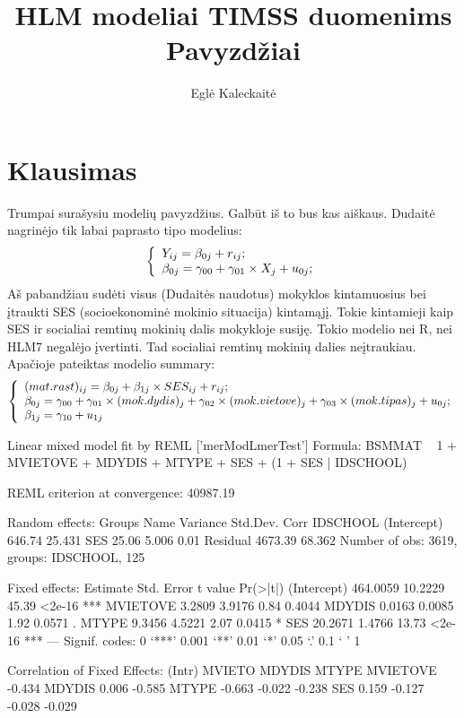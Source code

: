 \documentclass[a4paper]{article}
\title{HLM modeliai TIMSS duomenims\\Pavyzdžiai}
\author{Eglė Kaleckaitė}
\begin{document}


\maketitle
\section{Klausimas}
Trumpai surašysiu modelių pavyzdžius. Galbūt iš to bus kas aiškaus. Dudaitė nagrinėjo tik labai paprasto tipo modelius:
\[ \left\{
  \begin{array}{l l}
    Y_{ij} = \beta_{0j}+r_{ij}; \\
    \beta_{0j} = \gamma_{00} + \gamma_{01}\times X_{j}+u_{0j};
  \end{array} \right.\]
Aš pabandžiau sudėti visus (Dudaitės naudotus) mokyklos kintamuosius bei įtraukti SES (socioekonominė mokinio situacija) kintamąjį. Tokie kintamieji kaip SES ir socialiai remtinų mokinių dalis mokykloje susiję. Tokio modelio nei R, nei HLM7 negalėjo įvertinti. Tad socialiai remtinų mokinių dalies neįtraukiau. Apačioje pateiktas modelio summary:
\[ \left\{
  \begin{array}{l l}
    (mat.rast)_{ij} = \beta_{0j}+\beta_{1j}\times SES_{ij}+r_{ij}; \\
    \beta_{0j} = \gamma_{00} + \gamma_{01}\times (mok.dydis)_{j}+ \gamma_{02}\times (mok.vietove)_{j}+ \gamma_{03}\times (mok.tipas)_{j}+u_{0j};\\
    \beta_{1j} = \gamma_{10}+u_{1j}
  \end{array} \right.\]
\begin{Schunk}
\begin{Soutput}
Linear mixed model fit by REML ['merModLmerTest']
Formula: BSMMAT ~ 1 + MVIETOVE + MDYDIS + MTYPE + SES + (1 + SES | IDSCHOOL) 

REML criterion at convergence: 40987.19 

Random effects:
 Groups   Name        Variance Std.Dev. Corr
 IDSCHOOL (Intercept)  646.74  25.431       
          SES           25.06   5.006   0.01
 Residual             4673.39  68.362       
Number of obs: 3619, groups: IDSCHOOL, 125

Fixed effects:
            Estimate Std. Error t value Pr(>|t|)    
(Intercept) 464.0059    10.2229   45.39   <2e-16 ***
MVIETOVE      3.2809     3.9176    0.84   0.4044    
MDYDIS        0.0163     0.0085    1.92   0.0571 .  
MTYPE         9.3456     4.5221    2.07   0.0415 *  
SES          20.2671     1.4766   13.73   <2e-16 ***
---
Signif. codes:  0 ‘***’ 0.001 ‘**’ 0.01 ‘*’ 0.05 ‘.’ 0.1 ‘ ’ 1

Correlation of Fixed Effects:
         (Intr) MVIETO MDYDIS MTYPE 
MVIETOVE -0.434                     
MDYDIS    0.006 -0.585              
MTYPE    -0.663 -0.022 -0.238       
SES       0.159 -0.127 -0.028 -0.029
\end{Soutput}
\end{Schunk}
\end{document}
